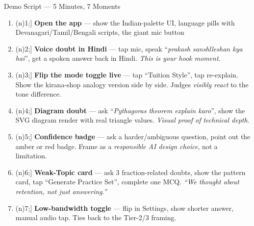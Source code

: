 \documentclass[aspectratio=169, 12pt]{beamer}
\newcommand{\badge}[2][deepgreen]{%
  \tikz[baseline=(n.base)]\node[fill=#1,text=white,rounded corners=3pt,
    inner sep=2pt,font=\scriptsize\bfseries](n){#2};}
\begin{document}
\begin{frame}{Demo Script --- 5 Minutes, 7 Moments}
  \begin{enumerate}
    \item[\badge{1}] \textbf{Open the app} --- show the Indian-palette UI,
          language pills with Devanagari/Tamil/Bengali scripts,
          the giant mic button
    \vspace{4pt}
    \item[\badge{2}] \textbf{Voice doubt in Hindi} ---
          tap mic, speak ``\emph{prakash sanshlleshan kya hai}'',
          get a spoken answer back in Hindi.
          \emph{This is your hook moment.}
    \vspace{4pt}
    \item[\badge{3}] \textbf{Flip the mode toggle live} ---
          tap ``Tuition Style'', tap re-explain.
          Show the kirana-shop analogy version side by side.
          Judges \emph{visibly react} to the tone difference.
    \vspace{4pt}
    \item[\badge{4}] \textbf{Diagram doubt} ---
          ask ``\emph{Pythagoras theorem explain karo}'',
          show the SVG diagram render with real triangle values.
          \emph{Visual proof of technical depth.}
    \vspace{4pt}
    \item[\badge{5}] \textbf{Confidence badge} ---
          ask a harder/ambiguous question, point out the amber or
          red badge. Frame as a \emph{responsible AI design choice},
          not a limitation.
    \vspace{4pt}
    \item[\badge{6}] \textbf{Weak-Topic card} ---
          ask 3 fraction-related doubts, show the pattern card,
          tap ``Generate Practice Set'', complete one MCQ.
          \emph{``We thought about retention, not just answering.''}
    \vspace{4pt}
    \item[\badge{7}] \textbf{Low-bandwidth toggle} ---
          flip in Settings, show shorter answer, manual audio tap.
          Ties back to the Tier-2/3 framing.
  \end{enumerate}
\end{frame}
\end{document}
